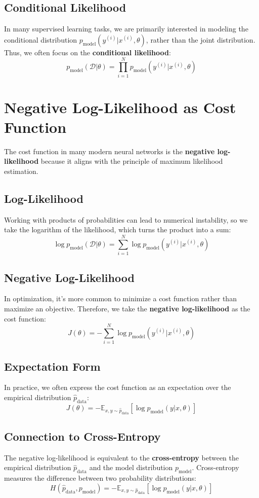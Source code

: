 \begin{notechapter}
\subsection{Conditional Likelihood}
In many supervised learning tasks, we are primarily interested in modeling the conditional distribution \( p_{\text{model}}(y^{(i)} | x^{(i)}, \theta) \), rather than the joint distribution. Thus, we often focus on the \textbf{conditional likelihood}:
\[
p_{\text{model}}(\mathcal{D} | \theta) = \prod_{i=1}^N p_{\text{model}}(y^{(i)} | x^{(i)}, \theta)
\]

\section{Negative Log-Likelihood as Cost Function}
The cost function in many modern neural networks is the \textbf{negative log-likelihood} because it aligns with the principle of maximum likelihood estimation.

\subsection{Log-Likelihood}
Working with products of probabilities can lead to numerical instability, so we take the logarithm of the likelihood, which turns the product into a sum:
\[
\log p_{\text{model}}(\mathcal{D} | \theta) = \sum_{i=1}^N \log p_{\text{model}}(y^{(i)} | x^{(i)}, \theta)
\]

\subsection{Negative Log-Likelihood}
In optimization, it's more common to minimize a cost function rather than maximize an objective. Therefore, we take the \textbf{negative log-likelihood} as the cost function:
\[
J(\theta) = -\sum_{i=1}^N \log p_{\text{model}}(y^{(i)} | x^{(i)}, \theta)
\]

\subsection{Expectation Form}
In practice, we often express the cost function as an expectation over the empirical distribution \( \hat{p}_{\text{data}} \):
\[
J(\theta) = -\mathbb{E}_{x,y \sim \hat{p}_{\text{data}}} \left[ \log p_{\text{model}}(y | x, \theta) \right]
\]

\subsection{Connection to Cross-Entropy}
The negative log-likelihood is equivalent to the \textbf{cross-entropy} between the empirical distribution \( \hat{p}_{\text{data}} \) and the model distribution \( p_{\text{model}} \). Cross-entropy measures the difference between two probability distributions:
\[
H(\hat{p}_{\text{data}}, p_{\text{model}}) = -\mathbb{E}_{x,y \sim \hat{p}_{\text{data}}} \left[ \log p_{\text{model}}(y | x, \theta) \right]
\]


\end{notechapter}
